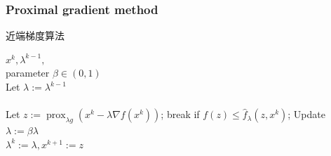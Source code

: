 \documentclass[10pt,aspectratio=43,mathserif,dvipsnames,svgnames,x11names]{beamer}
\begin{document}
	\begin{frame}
		\frametitle{Proximal gradient method}
		\begin{algorithm}[H]                           %
			\caption{近端梯度算法}          %
			\label{alg1}      %
			\begin{algorithmic}  %
				\Require
				$x^{k}, \lambda^{k-1},$\\
				parameter $\beta \in(0,1)$ \\
				Let $\lambda:=\lambda^{k-1}$\\
				\Repeat\\
				\State  Let $z:=\operatorname{prox}_{\lambda g}\left(x^{k}-\lambda \nabla f\left(x^{k}\right)\right)$;
				\State  break if $f(z) \leq \hat{f}_{\lambda}\left(z, x^{k}\right)$;
				\State Update $\lambda:=\beta \lambda$ \\
				\Return  $\lambda^{k}:=\lambda, x^{k+1}:=z$
			\end{algorithmic}
		\end{algorithm}
	\end{frame}
\end{document}
